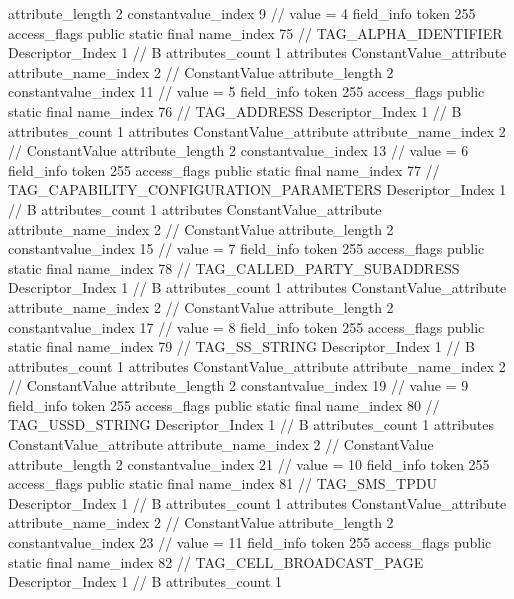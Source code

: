{{{{{{{					attribute_length	2
					constantvalue_index	9		// value = 4
				}
				}
			}
			field_info {
				token	255
				access_flags	public static final
				name_index	75		// TAG_ALPHA_IDENTIFIER
				Descriptor_Index	1		// B
				attributes_count	1
				attributes {
				ConstantValue_attribute {
					attribute_name_index	2		// ConstantValue
					attribute_length	2
					constantvalue_index	11		// value = 5
				}
				}
			}
			field_info {
				token	255
				access_flags	public static final
				name_index	76		// TAG_ADDRESS
				Descriptor_Index	1		// B
				attributes_count	1
				attributes {
				ConstantValue_attribute {
					attribute_name_index	2		// ConstantValue
					attribute_length	2
					constantvalue_index	13		// value = 6
				}
				}
			}
			field_info {
				token	255
				access_flags	public static final
				name_index	77		// TAG_CAPABILITY_CONFIGURATION_PARAMETERS
				Descriptor_Index	1		// B
				attributes_count	1
				attributes {
				ConstantValue_attribute {
					attribute_name_index	2		// ConstantValue
					attribute_length	2
					constantvalue_index	15		// value = 7
				}
				}
			}
			field_info {
				token	255
				access_flags	public static final
				name_index	78		// TAG_CALLED_PARTY_SUBADDRESS
				Descriptor_Index	1		// B
				attributes_count	1
				attributes {
				ConstantValue_attribute {
					attribute_name_index	2		// ConstantValue
					attribute_length	2
					constantvalue_index	17		// value = 8
				}
				}
			}
			field_info {
				token	255
				access_flags	public static final
				name_index	79		// TAG_SS_STRING
				Descriptor_Index	1		// B
				attributes_count	1
				attributes {
				ConstantValue_attribute {
					attribute_name_index	2		// ConstantValue
					attribute_length	2
					constantvalue_index	19		// value = 9
				}
				}
			}
			field_info {
				token	255
				access_flags	public static final
				name_index	80		// TAG_USSD_STRING
				Descriptor_Index	1		// B
				attributes_count	1
				attributes {
				ConstantValue_attribute {
					attribute_name_index	2		// ConstantValue
					attribute_length	2
					constantvalue_index	21		// value = 10
				}
				}
			}
			field_info {
				token	255
				access_flags	public static final
				name_index	81		// TAG_SMS_TPDU
				Descriptor_Index	1		// B
				attributes_count	1
				attributes {
				ConstantValue_attribute {
					attribute_name_index	2		// ConstantValue
					attribute_length	2
					constantvalue_index	23		// value = 11
				}
				}
			}
			field_info {
				token	255
				access_flags	public static final
				name_index	82		// TAG_CELL_BROADCAST_PAGE
				Descriptor_Index	1		// B
				attributes_count	1
}}}}}
